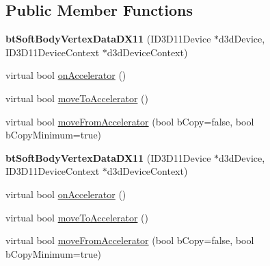 \subsection*{Public Member Functions}
\begin{DoxyCompactItemize}
\item 
\mbox{\label{classbtSoftBodyVertexDataDX11_a67f758eb5b6c417171bd737e27d73d69}} 
{\bfseries bt\+Soft\+Body\+Vertex\+Data\+D\+X11} (I\+D3\+D11\+Device $\ast$d3d\+Device, I\+D3\+D11\+Device\+Context $\ast$d3d\+Device\+Context)
\item 
virtual bool \hyperlink{classbtSoftBodyVertexDataDX11_a735a87a0a4acc856b2f656bf684852e4}{on\+Accelerator} ()
\item 
virtual bool \hyperlink{classbtSoftBodyVertexDataDX11_ac12f0c144bc116e3a0e4c11fc0e55365}{move\+To\+Accelerator} ()
\item 
virtual bool \hyperlink{classbtSoftBodyVertexDataDX11_a32d4193d6e162e0a7a57975ebbab7a16}{move\+From\+Accelerator} (bool b\+Copy=false, bool b\+Copy\+Minimum=true)
\item 
\mbox{\label{classbtSoftBodyVertexDataDX11_a67f758eb5b6c417171bd737e27d73d69}} 
{\bfseries bt\+Soft\+Body\+Vertex\+Data\+D\+X11} (I\+D3\+D11\+Device $\ast$d3d\+Device, I\+D3\+D11\+Device\+Context $\ast$d3d\+Device\+Context)
\item 
virtual bool \hyperlink{classbtSoftBodyVertexDataDX11_a60f9399bc7a7d652a55e7f1f2140f2b3}{on\+Accelerator} ()
\item 
virtual bool \hyperlink{classbtSoftBodyVertexDataDX11_aa68255e1508006f34dedf58855e9db4f}{move\+To\+Accelerator} ()
\item 
virtual bool \hyperlink{classbtSoftBodyVertexDataDX11_a16599d413d7fc7c96dfb6a335e43079e}{move\+From\+Accelerator} (bool b\+Copy=false, bool b\+Copy\+Minimum=true)
\end{DoxyCompactItemize}
